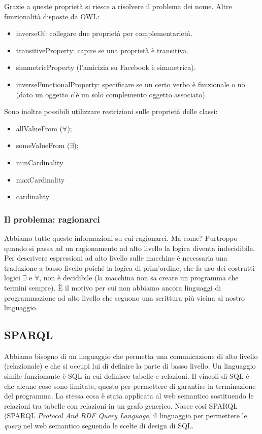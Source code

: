 				Grazie a queste proprietà si riesce a risolvere il problema dei nome. Altre funzionalità disposte da OWL:
				
					\begin{itemize}
						\item inverseOf: collegare due proprietà per complementarietà.
						\item transitiveProperty: capire se una proprietà è transitiva.
						\item simmetricProperty (l'amicizia su Facebook è simmetrica).
						\item inverseFunctionalProperty: specificare se un certo verbo è funzionale o no (dato un oggetto c'è un solo complemento oggetto associato).
					\end{itemize}
					
				Sono inoltre possibili utilizzare restrizioni sulle proprietà delle classi:
				\begin{itemize}
					\item allValueFrom ($\forall$);
					\item someValueFrom ($\exists$);
					\item minCardinality
					\item maxCardinality
					\item cardinality
				\end{itemize}
				
			\subsubsection{Il problema: ragionarci}
				Abbiamo tutte queste informazioni su cui ragionarci. Ma come? Purtroppo quando si passa ad un ragionamento ad alto livello la logica diventa indecidibile. Per descrivere espressioni ad alto livello sulle macchine è necessaria una traduzione a basso livello poiché la logica di prim'ordine, che fa uso dei costrutti logici $\exists$ e $\forall$, non è decidibile (la macchina non sa creare un programma che termini sempre). È il motivo per cui non abbiamo ancora linguaggi di programmazione ad alto livello che seguono una scrittura più vicina al nostro linguaggio.
			
		\subsection{SPARQL}
			Abbiamo bisogno di un linguaggio che permetta una comunicazione di alto livello (relazionale) e che si occupi lui di definire la parte di basso livello. Un linguaggio simile funzionante è SQL in cui definisce tabelle e relazioni. Il vincoli di SQL è che alcune cose sono limitate, questo per permettere di garantire la terminazione del programma. La stessa cosa è stata applicata al web semantico sostituendo le relazioni tra tabelle con relazioni in un grafo generico. Nasce così SPARQL (SPARQL \emph{Protocol And RDF Query Language}, il linguaggio per permettere le \emph{query} nel web semantico seguendo le scelte di design di SQL.
		
